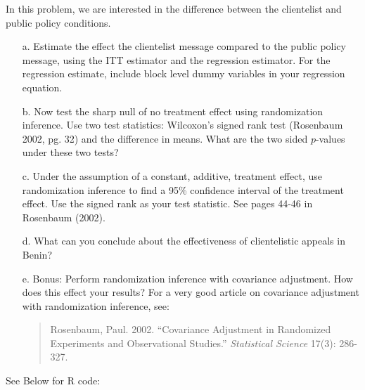 \documentclass{article}
\begin{document}
\begin{itemize}
\noindent In this problem, we are interested in the difference between
the clientelist and public policy conditions.  
\begin{itemize}
\item[a.] Estimate the effect the clientelist message compared to the
  public policy message, using the ITT estimator and the regression
  estimator. For the regression estimate, include block level dummy
  variables in your regression equation.  
\item[b.] Now test the sharp null
  of no treatment effect using randomization inference. Use two test
  statistics: Wilcoxon’s signed rank test (Rosenbaum 2002, pg. 32) and
  the difference in means. What are the two sided $p$-values under these
  two tests?  
\item[c.] Under the assumption of a constant, additive, treatment
  effect, use randomization inference to find a 95\% confidence
  interval of the treatment effect. Use the signed rank as your test
  statistic. See pages 44-46 in Rosenbaum (2002).
\item[d.] What can you conclude about the effectiveness of clientelistic
  appeals in Benin?
\item[e.] Bonus: Perform randomization inference with covariance adjustment. How does this effect your results? For a very good article on  covariance adjustment with randomization inference, see: 
\begin{quote}
Rosenbaum, Paul. 2002. “Covariance Adjustment in Randomized Experiments and Observational Studies.” \textit{Statistical Science} 17(3): 286-327. 
\end{quote}
\end{itemize}
\end{itemize}

See Below for R code:
\end{document}
